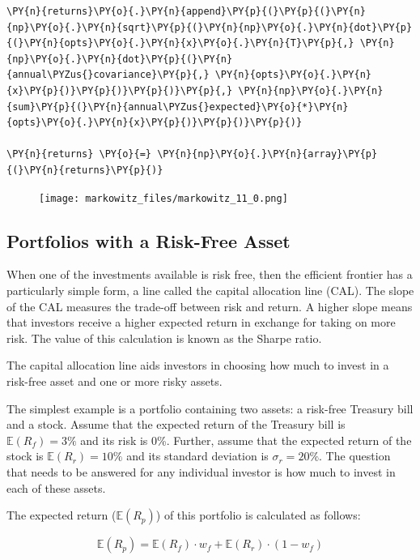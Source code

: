 \begin{tcolorbox}[breakable, size=fbox, boxrule=1pt, pad at break*=1mm,colback=cellbackground, colframe=cellborder]
\begin{Verbatim}[commandchars=\\\{\}]
    \PY{n}{returns}\PY{o}{.}\PY{n}{append}\PY{p}{(}\PY{p}{(}\PY{n}{np}\PY{o}{.}\PY{n}{sqrt}\PY{p}{(}\PY{n}{np}\PY{o}{.}\PY{n}{dot}\PY{p}{(}\PY{n}{opts}\PY{o}{.}\PY{n}{x}\PY{o}{.}\PY{n}{T}\PY{p}{,} \PY{n}{np}\PY{o}{.}\PY{n}{dot}\PY{p}{(}\PY{n}{annual\PYZus{}covariance}\PY{p}{,} \PY{n}{opts}\PY{o}{.}\PY{n}{x}\PY{p}{)}\PY{p}{)}\PY{p}{)}\PY{p}{,} \PY{n}{np}\PY{o}{.}\PY{n}{sum}\PY{p}{(}\PY{n}{annual\PYZus{}expected}\PY{o}{*}\PY{n}{opts}\PY{o}{.}\PY{n}{x}\PY{p}{)}\PY{p}{)}\PY{p}{)}

\PY{n}{returns} \PY{o}{=} \PY{n}{np}\PY{o}{.}\PY{n}{array}\PY{p}{(}\PY{n}{returns}\PY{p}{)}
\end{Verbatim}
\end{tcolorbox}

    \begin{figure}
    \centering
    \texttt{[image: markowitz\_files/markowitz\_11\_0.png]}
    \end{figure}
    
\subsection{Portfolios with a Risk-Free
Asset}\label{portfolios-with-a-risk-free-asset}

When one of the investments available is risk free, then the efficient
frontier has a particularly simple form, a line called the capital
allocation line (CAL). The slope of the CAL measures the trade-off
between risk and return. A higher slope means that investors receive a
higher expected return in exchange for taking on more risk. The value of
this calculation is known as the Sharpe ratio.

The capital allocation line aids investors in choosing how much to
invest in a risk-free asset and one or more risky assets.

The simplest example is a portfolio containing two assets: a risk-free
Treasury bill and a stock. Assume that the expected return of the
Treasury bill is \(\mathbb{E}(R_f)=3\%\) and its risk is 0\%. Further, assume that
the expected return of the stock is \(\mathbb{E}(R_r)=10\%\) and its standard
deviation is \(\sigma_r=20\%\). The question that needs to be answered
for any individual investor is how much to invest in each of these
assets.

The expected return (\(\mathbb{E}(R_p)\)) of this portfolio is calculated as
follows:

\[ \mathbb{E}(R_p) = \mathbb{E}(R_f)\cdot w_f + \mathbb{E}(R_r)\cdot (1- w_f) \]

